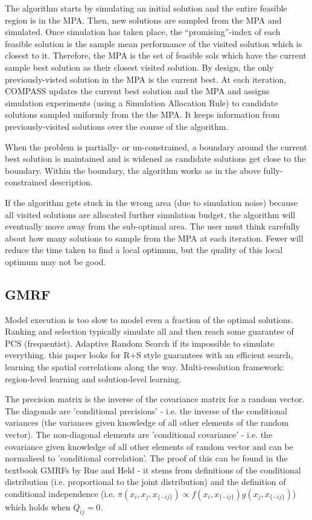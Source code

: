 \message{ !name(SO-Methods.tex)}\documentclass{article}
\begin{document}
The algorithm starts by simulating an initial solution and the entire feasible region is in the MPA. Then, new solutions are sampled from the MPA and simulated. Once simulation has taken place, the ``promising''-index of each feasible solution is the sample mean performance of the visited solution which is closest to it. Therefore, the MPA is the set of feasible sols which have the current sample best solution as their closest visited solution. By design, the only previously-visted solution in the MPA is the current best. At each iteration, COMPASS updates the current best solution and the MPA and assigns simulation experiments (using a Simulation Allocation Rule) to candidate solutions sampled uniformly from the the MPA. It keeps information from previously-visited solutions over the course of the algorithm.   \newline

When the problem is partially- or un-constrained, a boundary around the current best solution is maintained and is widened as candidate solutions get close to the boundary. Within the boundary, the algorithm works as in the above fully-constrained description. \newline

If the algorithm gets stuck in the wrong area (due to simulation noise) because all visited solutions are allocated further simulation budget, the algorithm will eventually move away from the sub-optimal area. The user must think carefully about how many solutions to sample from the MPA at each iteration. Fewer will reduce the time taken to find a local optimum, but the quality of this local optimum may not be good. 

\subsection{GMRF}

Model execution is too slow to model even a fraction of the optimal solutions. Ranking and selection typically simulate all and then reach some guarantee of PCS (frequentist). Adaptive Random Search if its impossible to simulate everything. this paper looks for R+S style guarantees with an efficient search, learning the spatial correlations along the way. Multi-resolution framework: region-level learning and solution-level learning. \newline

The precision matrix is the inverse of the covariance matrix for a random vector. The diagonals are 'conditional precisions' - i.e. the inverse of the conditional variances (the variances given knowledge of all other elements of the random vector). The non-diagonal elements are 'conditional covariance' - i.e. the covariance given knowledge of all other elements of random vector and can be normalised to 'conditional correlation'. The proof of this can be found in the textbook GMRFs by Rue and Held - it stems from definitions of the conditional distribution (i.e. proportional to the joint distribution) and the definition of conditional independence (i.e. $\pi(x_i,x_j,x_{\{-ij\}}) \propto f(x_i,x_{\{-ij\}})g(x_j,x_{\{-ij\}})$) which holds when $Q_{ij}=0$. \newline
\end{document}
